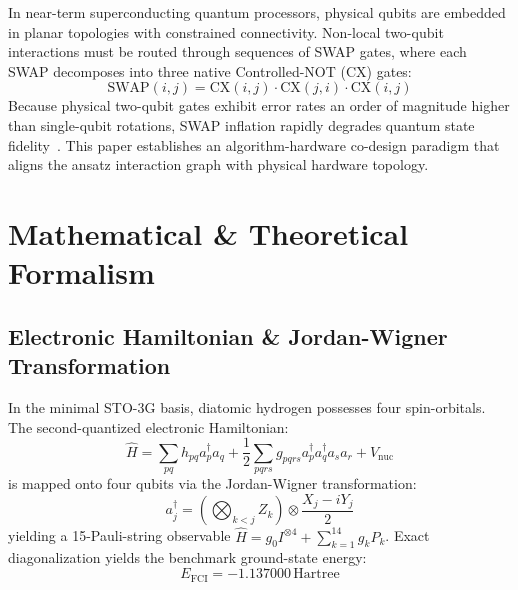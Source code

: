 \documentclass[journal,twocolumn]{article}
\begin{document}
In near-term superconducting quantum processors, physical qubits are embedded in planar topologies with constrained connectivity. Non-local two-qubit interactions must be routed through sequences of SWAP gates, where each SWAP decomposes into three native Controlled-NOT (CX) gates:
\begin{equation}
\text{SWAP}(i, j) = \text{CX}(i, j) \cdot \text{CX}(j, i) \cdot \text{CX}(i, j)
\end{equation}
Because physical two-qubit gates exhibit error rates an order of magnitude higher than single-qubit rotations, SWAP inflation rapidly degrades quantum state fidelity~\cite{Kandala2017}. This paper establishes an algorithm-hardware co-design paradigm that aligns the ansatz interaction graph with physical hardware topology.

\section{Mathematical \& Theoretical Formalism}

\subsection{Electronic Hamiltonian \& Jordan-Wigner Transformation}
In the minimal STO-3G basis, diatomic hydrogen possesses four spin-orbitals. The second-quantized electronic Hamiltonian:
\begin{equation}
\hat{H} = \sum_{pq} h_{pq} a_p^\dagger a_q + \frac{1}{2}\sum_{pqrs} g_{pqrs} a_p^\dagger a_q^\dagger a_s a_r + V_{\text{nuc}}
\end{equation}
is mapped onto four qubits via the Jordan-Wigner transformation:
\begin{equation}
a_j^\dagger = \left(\bigotimes_{k<j} Z_k\right) \otimes \frac{X_j - iY_j}{2}
\end{equation}
yielding a 15-Pauli-string observable $\hat{H} = g_0 I^{\otimes 4} + \sum_{k=1}^{14} g_k P_k$. Exact diagonalization yields the benchmark ground-state energy:
\begin{equation}
E_{\text{FCI}} = -1.137000\,\text{Hartree}
\end{equation}
\end{document}

